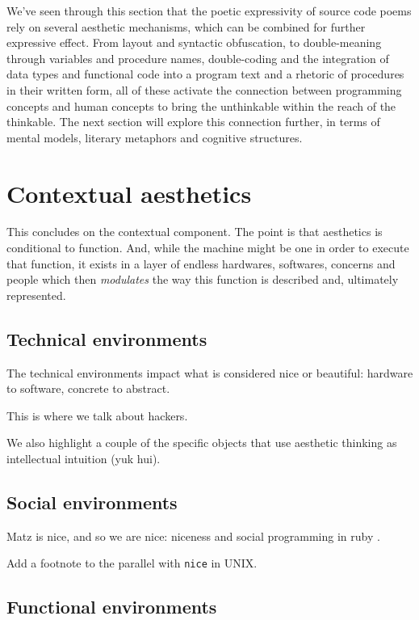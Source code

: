We've seen through this section that the poetic expressivity of source code poems rely on several aesthetic mechanisms, which can be combined for further expressive effect. From layout and syntactic obfuscation, to double-meaning through variables and procedure names, double-coding and the integration of data types and functional code into a program text and a rhetoric of procedures in their written form, all of these activate the connection between programming concepts and human concepts to bring the unthinkable within the reach of the thinkable. The next section will explore this connection further, in terms of mental models, literary metaphors and cognitive structures.

\section{Contextual aesthetics} %
\label{sec:contextual-aesthetics}

This concludes on the contextual component. The point is that aesthetics is conditional to function. And, while the machine might be one in order to execute that function, it exists in a layer of endless hardwares, softwares, concerns and people which then \emph{modulates} the way this function is described and, ultimately represented.

\subsection{Technical environments}
\label{subsec:technical-environments}

The technical environments impact what is considered nice or beautiful: hardware to software, concrete to abstract.

This is where we talk about hackers.

We also highlight a couple of the specific objects that use aesthetic thinking as intellectual intuition (yuk hui).

\subsection{Social environments}
\label{subsec:social-environments}

Matz is nice, and so we are nice: niceness and social programming in ruby \citep{fleetwood-boldt_matz_2020}.

Add a footnote to the parallel with \lstinline{nice} in UNIX.

\subsection{Functional environments}
\label{subsec:functional-environments}


